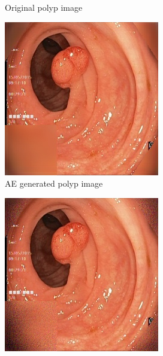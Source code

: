 \begin{figure}[h]
\begin{subfigure}[t]{\myfigsizethree}
            \caption{Original polyp image}    
            \label{fig:p_ORIG_both1}
        \end{subfigure}
        \qquad
        \begin{subfigure}[t]{\myfigsizethree}   
            \centering 
            \includegraphics[width=\textwidth]{experiments/figures/both/PAE.jpg}
            \caption{AE generated polyp image}    
            \label{fig:p_AE_both1}
        \end{subfigure}
        \qquad%
        \begin{subfigure}[t]{\myfigsizethree}   
            \centering 
            \includegraphics[width=\textwidth]{experiments/figures/both/PGAN.jpg}

\end{subfigure}
\end{figure}
